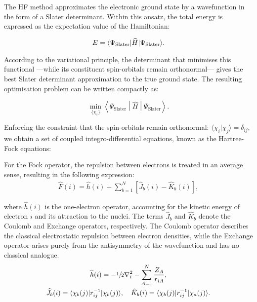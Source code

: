 The \gls{HF} method approximates the electronic ground state by a wavefunction
in the form of a Slater determinant.
Within this ansatz, the total energy is
expressed as the expectation value of the Hamiltonian:

\begin{align}
  E = \langle \Psi_\mathrm{Slater} | \widehat{H} | \Psi_\mathrm{Slater} \rangle .
  \label{HF_energy}
\end{align}

According to the variational principle, the determinant that minimises this
functional ---while its constituent spin-orbitals remain orthonormal--- gives the
best Slater determinant approximation to the true ground state. The resulting
optimisation problem can be written compactly as:

\begin{equation}
  \min_{\{\chi_i\}} \left\langle \Psi_\mathrm{Slater} \middle| \widehat{H} \middle| \Psi_\mathrm{Slater} \right\rangle.
\end{equation}

Enforcing the constraint that the spin-orbitals remain orthonormal: $\langle
\chi_i | \chi_j \rangle = \delta_{ij}$, we obtain a set of coupled
integro-differential equations, known as the Hartree-Fock equations:


\newpage
For the Fock operator, the repulsion between electrons is treated in an average
sense, resulting in the following expression:
%
\begin{align}
  \widehat{F} (i) = \widehat{h}(i) + \sum_{b=1}^N [\hat{J}_b (i) - \hat{K}_b (i)],
\end{align}

\noindent where $\widehat{h}(i)$ is the one-electron operator, accounting for
the kinetic energy of electron $i$ and its attraction to the nuclei. The terms
$\hat{J}_b$ and $\hat{K}_b$ denote the Coulomb and Exchange operators,
respectively. The Coulomb operator describes the classical electrostatic
repulsion between electron densities, while the Exchange operator arises purely
from the antisymmetry of the wavefunction and has no classical analogue.
%
\begin{gather}
  \widehat{h}(i) = -\sfrac{1}{2}\nabla^2_i -\sum_{A=1}^N\frac{Z_A}{r_{iA}}, \nonumber\\
  \widehat{J}_b (i) = \langle \chi_b(j) | r_{ij}^{-1} | \chi_b(j) \rangle, \quad
  \hat{K}_b (i) = \langle \chi_b(j) | r_{ij}^{-1} | \chi_a(j) \rangle.
\end{gather}

